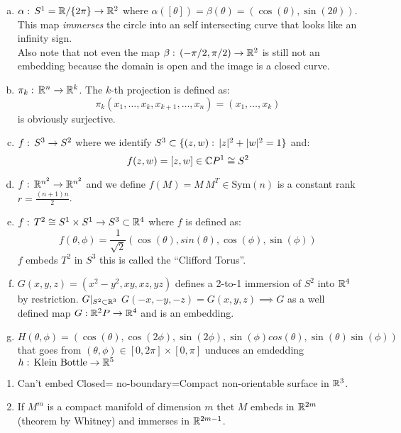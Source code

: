 \begin{examples}
\begin{enumerate}[a)]
\item $\alpha :\, S^1 = \mathbb{R}/\{2\pi\} \to \mathbb{R}^2$ where $\alpha([\theta]) = \beta(\theta) = (\cos(\theta), \sin(2\theta))$. This map \emph{immerses} the circle into an self intersecting curve that looks like an infinity sign. \\
Also note that not even the map $\beta:\, (-\pi/2, \pi/2) \to \mathbb{R}^2$ is still not an embedding because the domain is open and the image is a closed curve.
\item $\pi_k :\, \mathbb{R}^n \to \mathbb{R}^k$. The $k$-th projection is defined as:
$$\pi_k(x_1,\ldots, x_k,x_{k+1},\ldots, x_n)= (x_1,\ldots, x_k)$$ is obviously surjective. 
\item $f:\, S^3 \to S^2$ where we identify $S^3\subset \{(z,w) :\, |z|^2 + |w|^2 =1 \}$ and:
$$f(z,w) = [z,w] \in \mathbb{C} P^1 \cong S^2$$

\item $f:\, \mathbb{R}^{n^2} \to \mathbb{R}^{n^2} $ and we define $f(M) = M\,M^T\in \text{Sym}(n)$ is a constant rank $r=\frac{(n+1)n}{2}$.

\item $f:\, T^2 \cong S^1\times S^1 \to S^3 \subset \mathbb{R}^4$ where $f$ is defined as:
$$f(\theta,\phi) = \frac{1}{\sqrt{2}} (\cos(\theta),sin(\theta),\cos(\phi),\sin(\phi))$$
$f$ embeds $T^2$ in $S^3$ this is called the ``Clifford Torus''.

\item $G(x,y,z) = (x^2-y^2, xy,xz,yz)$ defines a 2-to-1 immersion of $S^2$ into $\mathbb{R}^4$ by restriction. $G|_{S^2 \subset \mathbb{R}^3}$ $G(-x,-y,-z) = G(x,y,z) \implies G$ as a well defined map $G: \mathbb{R}^2 P\to \mathbb{R}^4$ and is an embedding.
\item $H(\theta, \phi) = (\cos(\theta),\cos(2\phi),\sin(2\phi),\sin(\phi)cos(\theta),\sin(\theta)\sin(\phi))$ that goes from $(\theta,\phi)\in [0,2\pi]\times [0,\pi]$ unduces an emdedding $h:\, \text{Klein Bottle} \to \mathbb{R}^5$
\end{enumerate}
\end{examples}

\begin{remarks}[Facts]
\hspace{2em}  
\begin{enumerate}
\item Can't embed Closed= no-boundary=Compact non-orientable surface in $\mathbb{R}^3$.
\item If $M^m$ is a compact manifold of dimension $m$ thet $M$ embeds in $\mathbb{R}^{2m}$ (theorem by Whitney) and immerses in $\mathbb{R}^{2m-1}$.
\end{enumerate}
\end{remarks}

